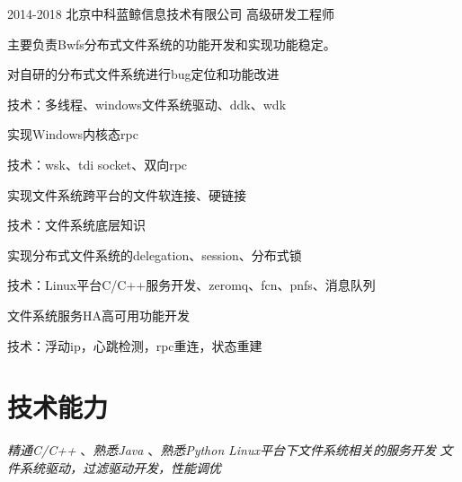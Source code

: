 \documentclass[10pt]{article} %
\begin{document}
\job
{2014-2018}
{北京中科蓝鲸信息技术有限公司}
{高级研发工程师}
{主要负责Bwfs分布式文件系统的功能开发和实现功能稳定。
\begin{itemize-noindent}
\item{对自研的分布式文件系统进行bug定位和功能改进}
\item{技术：多线程、windows文件系统驱动、ddk、wdk}
\item{实现Windows内核态rpc}
\item{技术：wsk、tdi socket、双向rpc}
\item{实现文件系统跨平台的文件软连接、硬链接}
\item{技术：文件系统底层知识}
\item{实现分布式文件系统的delegation、session、分布式锁}
\item{技术：Linux平台C/C++服务开发、zeromq、fcn、pnfs、消息队列}
\item{文件系统服务HA高可用功能开发}
\item{技术：浮动ip，心跳检测，rpc重连，状态重建}
\end{itemize-noindent}
}
\section{技术能力}
{
\textit{精通C/C++} 、\textit{熟悉Java} 、\textit{熟悉Python}
}
{
\textit{Linux平台下文件系统相关的服务开发}
}
{
\textit{文件系统驱动，过滤驱动开发，性能调优}
}
\end{document}
